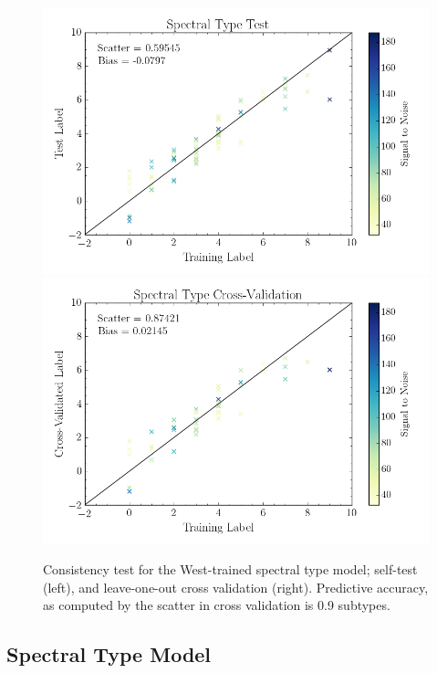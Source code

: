 \documentclass[twocolumn]{aastex62}
\begin{document}
\begin{figure}
	\begin{center}
	\includegraphics[width=\linewidth]{figures/self_test_spt.png}
	\includegraphics[width=\linewidth]{figures/crv_test_spt.png}
	\end{center}
	\caption{Consistency test for the West-trained spectral type model; self-test (left), and leave-one-out cross validation (right).  Predictive accuracy, as computed by the scatter in cross validation is 0.9 subtypes.}
	\label{fig:west_validation}
\end{figure}

\subsection{Spectral Type Model \label{subsec:west_results}}
\end{document}

